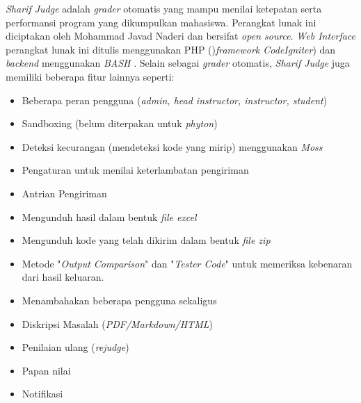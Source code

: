 \textit{Sharif Judge} adalah \textit{grader} otomatis yang mampu menilai ketepatan serta performansi program yang dikumpulkan mahasiswa. Perangkat lunak ini diciptakan oleh Mohammad Javad Naderi dan bersifat \textit{open source}. \textit{Web Interface} perangkat lunak ini ditulis menggunakan PHP ()\textit{framework CodeIgniter}) dan \textit{backend} menggunakan \textit{BASH} \cite{mjnaderi:14:sharifjudge}.
Selain sebagai \textit{grader} otomatis, \textit{Sharif Judge} juga memiliki beberapa fitur lainnya seperti:
\begin{itemize}
	\item Beberapa peran pengguna (\textit{admin, head instructor, instructor, student})
	\item Sandboxing (belum diterpakan untuk \textit{phyton})
	\item Deteksi kecurangan (mendeteksi kode yang mirip) menggunakan \textit{Moss}
	\item Pengaturan untuk menilai keterlambatan pengiriman
	\item Antrian Pengiriman
	\item Mengunduh hasil dalam bentuk \textit{file excel}
	\item Mengunduh kode yang telah dikirim dalam bentuk \textit{file zip}
	\item Metode "\textit{Output Comparison}" dan "\textit{Tester Code}" untuk memeriksa kebenaran dari hasil keluaran.
	\item Menambahakan beberapa pengguna sekaligus
	\item Diskripsi Masalah (\textit{PDF/Markdown/HTML})
	\item Penilaian ulang (\textit{rejudge})
	\item Papan nilai
	\item Notifikasi
\end{itemize}

